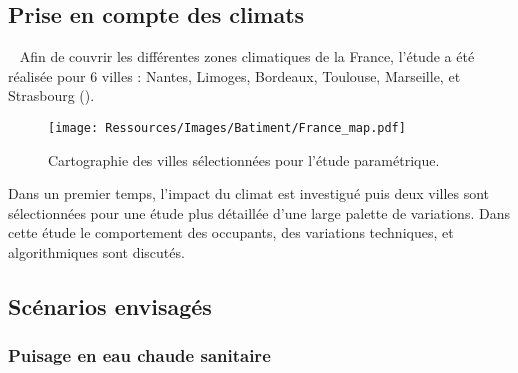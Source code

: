 \subsection{Prise en compte des climats} %
\label{sub:prise_en_compte_des_climats}
~
Afin de couvrir les différentes zones climatiques de la France, l’étude a été réalisée
pour 6 villes : Nantes, Limoges, Bordeaux, Toulouse, Marseille, et Strasbourg ().
\begin{figure}
    \begin{center}
        \texttt{[image: Ressources/Images/Batiment/France\_map.pdf]}
    \end{center}
    \caption{Cartographie des villes sélectionnées pour l’étude paramétrique.
             \label{fig:carte_france}}
\end{figure}

Dans un premier temps, l’impact du climat est investigué puis deux villes sont
sélectionnées pour une étude plus détaillée d’une large palette de variations. Dans cette
étude le comportement des occupants, des variations techniques, et algorithmiques sont
discutés.




\subsection{Scénarios envisagés} %
\label{sub:scenarios_envisages}
\subsubsection{Puisage en eau chaude sanitaire} %
\label{ssub:puisage_en_eau_chaude_sanitaire}

